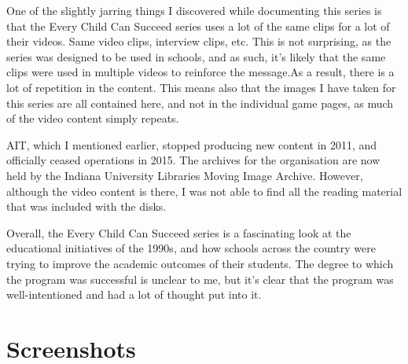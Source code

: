 One of the slightly jarring things I discovered while documenting this series is that the Every Child Can Succeed series uses a lot of the same clips for a lot of their videos. Same video clips, interview clips, etc. This is not surprising, as the series was designed to be used in schools, and as such, it's likely that the same clips were used in multiple videos to reinforce the message.As a result, there is a lot of repetition in the content. This means also that the images I have taken for this series are all contained here, and not in the individual game pages, as much of the video content simply repeats.

AIT, which I mentioned earlier, stopped producing new content in 2011, and officially ceased operations in 2015. The archives for the organisation are now held by the Indiana University Libraries Moving Image Archive. However, although the video content is there, I was not able to find all the reading material that was included with the disks.

Overall, the Every Child Can Succeed series is a fascinating look at the educational initiatives of the 1990s, and how schools across the country were trying to improve the academic outcomes of their students. The degree to which the program was successful is unclear to me, but it's clear that the program was well-intentioned and had a lot of thought put into it.

\pagebreak

\section{Screenshots}

